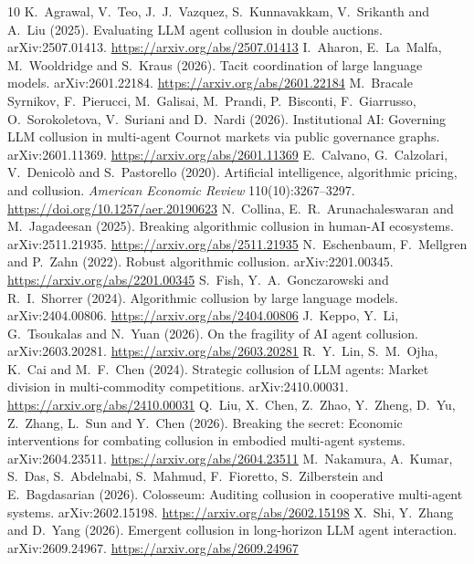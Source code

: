 \documentclass{article}
\begin{document}
\clearpage
\begin{thebibliography}{10}\small
{} K.~Agrawal, V.~Teo, J.~J.~Vazquez, S.~Kunnavakkam, V.~Srikanth and A.~Liu (2025). Evaluating LLM agent collusion in double auctions. arXiv:2507.01413. \url{https://arxiv.org/abs/2507.01413}
 I.~Aharon, E.~La~Malfa, M.~Wooldridge and S.~Kraus (2026). Tacit coordination of large language models. arXiv:2601.22184. \url{https://arxiv.org/abs/2601.22184}
 M.~Bracale Syrnikov, F.~Pierucci, M.~Galisai, M.~Prandi, P.~Bisconti, F.~Giarrusso, O.~Sorokoletova, V.~Suriani and D.~Nardi (2026). Institutional AI: Governing LLM collusion in multi-agent Cournot markets via public governance graphs. arXiv:2601.11369. \url{https://arxiv.org/abs/2601.11369}
 E.~Calvano, G.~Calzolari, V.~Denicol\`o and S.~Pastorello (2020). Artificial intelligence, algorithmic pricing, and collusion. \emph{American Economic Review} 110(10):3267--3297. \url{https://doi.org/10.1257/aer.20190623}
 N.~Collina, E.~R.~Arunachaleswaran and M.~Jagadeesan (2025). Breaking algorithmic collusion in human-AI ecosystems. arXiv:2511.21935. \url{https://arxiv.org/abs/2511.21935}
 N.~Eschenbaum, F.~Mellgren and P.~Zahn (2022). Robust algorithmic collusion. arXiv:2201.00345. \url{https://arxiv.org/abs/2201.00345}
 S.~Fish, Y.~A.~Gonczarowski and R.~I.~Shorrer (2024). Algorithmic collusion by large language models. arXiv:2404.00806. \url{https://arxiv.org/abs/2404.00806}
 J.~Keppo, Y.~Li, G.~Tsoukalas and N.~Yuan (2026). On the fragility of AI agent collusion. arXiv:2603.20281. \url{https://arxiv.org/abs/2603.20281}
 R.~Y.~Lin, S.~M.~Ojha, K.~Cai and M.~F.~Chen (2024). Strategic collusion of LLM agents: Market division in multi-commodity competitions. arXiv:2410.00031. \url{https://arxiv.org/abs/2410.00031}
 Q.~Liu, X.~Chen, Z.~Zhao, Y.~Zheng, D.~Yu, Z.~Zhang, L.~Sun and Y.~Chen (2026). Breaking the secret: Economic interventions for combating collusion in embodied multi-agent systems. arXiv:2604.23511. \url{https://arxiv.org/abs/2604.23511}
 M.~Nakamura, A.~Kumar, S.~Das, S.~Abdelnabi, S.~Mahmud, F.~Fioretto, S.~Zilberstein and E.~Bagdasarian (2026). Colosseum: Auditing collusion in cooperative multi-agent systems. arXiv:2602.15198. \url{https://arxiv.org/abs/2602.15198}
 X.~Shi, Y.~Zhang and D.~Yang (2026). Emergent collusion in long-horizon LLM agent interaction. arXiv:2609.24967. \url{https://arxiv.org/abs/2609.24967}
\end{thebibliography}
\end{document}
